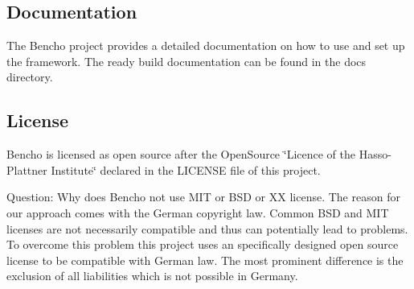 \subsection*{Documentation}

The Bencho project provides a detailed documentation on how to use and set up the framework. The ready build documentation can be found in the docs directory.

\subsection*{License}

Bencho is licensed as open source after the Open\-Source \char`\"{}\-Licence of the Hasso-\/\-Plattner Institute\char`\"{} declared in the L\-I\-C\-E\-N\-S\-E file of this project.

Question\-: Why does Bencho not use M\-I\-T or B\-S\-D or X\-X license. The reason for our approach comes with the German copyright law. Common B\-S\-D and M\-I\-T licenses are not necessarily compatible and thus can potentially lead to problems. To overcome this problem this project uses an specifically designed open source license to be compatible with German law. The most prominent difference is the exclusion of all liabilities which is not possible in Germany. 